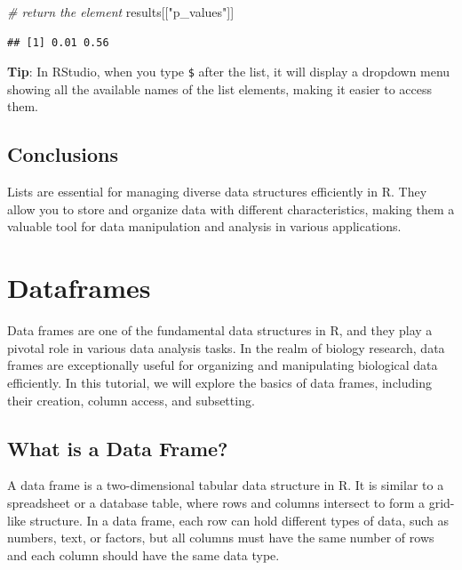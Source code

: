 \documentclass[
]{book}
\newenvironment{Shaded}{\begin{snugshade}}{\end{snugshade}}
\newcommand{\CommentTok}[1]{\textcolor[rgb]{0.56,0.35,0.01}{\textit{#1}}}
\newcommand{\NormalTok}[1]{#1}
\newcommand{\StringTok}[1]{\textcolor[rgb]{0.31,0.60,0.02}{#1}}
\begin{document}
\begin{Shaded}
\begin{Highlighting}[]
\CommentTok{\# return the element }
\NormalTok{results[[}\StringTok{"p\_values"}\NormalTok{]]}
\end{Highlighting}
\end{Shaded}

\begin{verbatim}
## [1] 0.01 0.56
\end{verbatim}

\textbf{Tip}: In RStudio, when you type \texttt{\$} after the list, it will display a dropdown menu showing all the available names of the list elements, making it easier to access them.

\hypertarget{conclusions}{%
\subsection{Conclusions}\label{conclusions}}

Lists are essential for managing diverse data structures efficiently in R. They allow you to store and organize data with different characteristics, making them a valuable tool for data manipulation and analysis in various applications.

\hypertarget{dataframes}{%
\section{Dataframes}\label{dataframes}}

Data frames are one of the fundamental data structures in R, and they play a pivotal role in various data analysis tasks. In the realm of biology research, data frames are exceptionally useful for organizing and manipulating biological data efficiently. In this tutorial, we will explore the basics of data frames, including their creation, column access, and subsetting.

\hypertarget{what-is-a-data-frame}{%
\subsection{What is a Data Frame?}\label{what-is-a-data-frame}}

A data frame is a two-dimensional tabular data structure in R. It is similar to a spreadsheet or a database table, where rows and columns intersect to form a grid-like structure. In a data frame, each row can hold different types of data, such as numbers, text, or factors, but all columns must have the same number of rows and each column should have the same data type.
\end{document}
